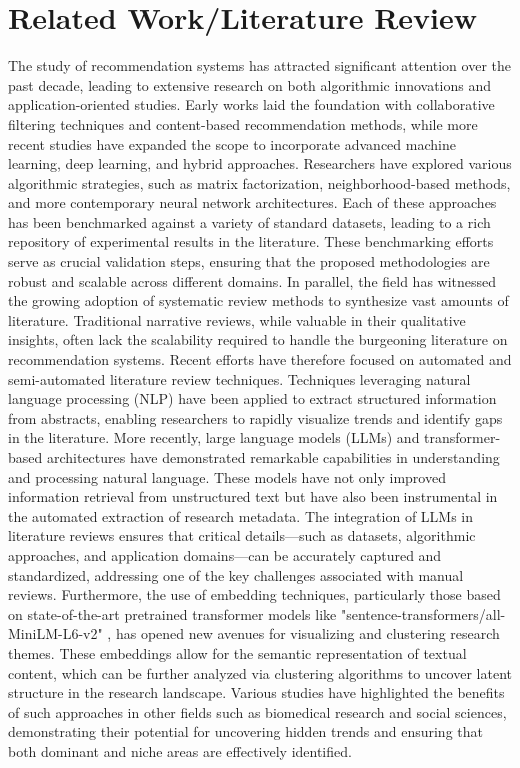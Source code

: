 \documentclass[
	a4paper, %
	10pt, %
	unnumberedsections, %
	twoside, %
]{LTJournalArticle}
\begin{document}
\section{Related Work/Literature Review}

The study of recommendation systems has attracted significant attention over the past decade, leading to extensive research on both algorithmic innovations and application-oriented studies. Early works laid the foundation with collaborative filtering techniques and content-based recommendation methods, while more recent studies have expanded the scope to incorporate advanced machine learning, deep learning, and hybrid approaches. 
Researchers have explored various algorithmic strategies, such as matrix factorization, neighborhood-based methods, and more contemporary neural network architectures. Each of these approaches has been benchmarked against a variety of standard datasets, leading to a rich repository of experimental results in the literature. These benchmarking efforts serve as crucial validation steps, ensuring that the proposed methodologies are robust and scalable across different domains.
In parallel, the field has witnessed the growing adoption of systematic review methods to synthesize vast amounts of literature. Traditional narrative reviews, while valuable in their qualitative insights, often lack the scalability required to handle the burgeoning literature on recommendation systems. Recent efforts have therefore focused on automated and semi-automated literature review techniques. Techniques leveraging natural language processing (NLP) have been applied to extract structured information from abstracts, enabling researchers to rapidly visualize trends and identify gaps in the literature.
More recently, large language models (LLMs) and transformer-based architectures have demonstrated remarkable capabilities in understanding and processing natural language. These models have not only improved information retrieval from unstructured text but have also been instrumental in the automated extraction of research metadata. The integration of LLMs in literature reviews ensures that critical details—such as datasets, algorithmic approaches, and application domains—can be accurately captured and standardized, addressing one of the key challenges associated with manual reviews.
Furthermore, the use of embedding techniques, particularly those based on state-of-the-art pretrained transformer models like "sentence-transformers/all-MiniLM-L6-v2" \cite{reimers-2019-sentence-bert}, has opened new avenues for visualizing and clustering research themes. These embeddings allow for the semantic representation of textual content, which can be further analyzed via clustering algorithms to uncover latent structure in the research landscape. Various studies have highlighted the benefits of such approaches in other fields such as biomedical research and social sciences, demonstrating their potential for uncovering hidden trends and ensuring that both dominant and niche areas are effectively identified.
\end{document}
